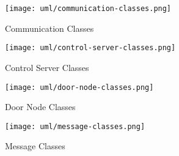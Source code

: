 
\begin{figure}[!htb]
\centering
\texttt{[image: uml/communication-classes.png]}
\caption{Communication Classes}
\label{fig:communication-classes}
\end{figure}


\begin{figure}[!htb]
\centering
\texttt{[image: uml/control-server-classes.png]}
\caption{Control Server Classes}
\label{fig:control-server-classes}
\end{figure}


\begin{figure}[!htb]
\centering
\texttt{[image: uml/door-node-classes.png]}
\caption{Door Node Classes}
\label{fig:door-node-classes}
\end{figure}


\begin{figure}[!htb]
\centering
\texttt{[image: uml/message-classes.png]}
\caption{Message Classes}
\label{fig:message-classes}
\end{figure}

